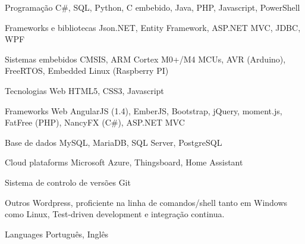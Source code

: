 


\begin{cvskills}


\cvskill
{Programação}
{C\#, SQL, Python, C embebido, Java, PHP, Javascript, PowerShell}


\cvskill
{Frameworks e bibliotecas}
{Json.NET, Entity Framework, ASP.NET MVC, JDBC, WPF}

\cvskill
{Sistemas embebidos}
{CMSIS, ARM Cortex M0+/M4 MCUs, AVR (Arduino),
\newline FreeRTOS, Embedded Linux (Raspberry PI)}


\cvskill
{Tecnologias Web}
{HTML5, CSS3, Javascript}


\cvskill
{Frameworks Web}
{AngularJS (1.4), EmberJS, Bootstrap, jQuery, moment.js, 
\newline FatFree (PHP), NancyFX (C\#), ASP.NET MVC}


\cvskill
{Base de dados}
{MySQL, MariaDB, SQL Server, PostgreSQL}


\cvskill
{Cloud plataforms}
{Microsoft Azure, Thingsboard, Home Assistant}


\cvskill
{Sistema de controlo de versões}
{Git}


\cvskill
{Outros}
{Wordpress, proficiente na linha de comandos/shell tanto em Windows como Linux, 
\newline
Test-driven development e integração continua.}

\cvskill
{Languages}
{Português, Inglês}


\end{cvskills}